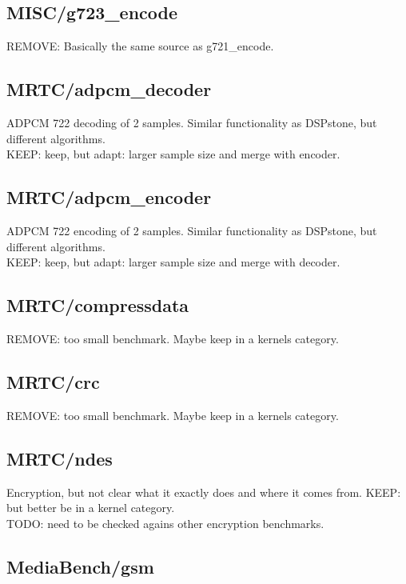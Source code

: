 \documentclass[a4paper]{article}
\begin{document}
\subsection{MISC/g723\_encode}

REMOVE: Basically the same source as g721\_encode.

\subsection{MRTC/adpcm\_decoder}

ADPCM 722 decoding of 2 samples. Similar functionality as 
DSPstone, but different algorithms. \\
KEEP: keep, but adapt: larger sample size and merge with encoder.

\subsection{MRTC/adpcm\_encoder}

ADPCM 722 encoding of 2 samples. Similar functionality as 
DSPstone, but different algorithms. \\
KEEP: keep, but adapt: larger sample size and merge with decoder.

\subsection{MRTC/compressdata}

REMOVE: too small benchmark. Maybe keep in a kernels category.

\subsection{MRTC/crc}

REMOVE: too small benchmark. Maybe keep in a kernels category.

\subsection{MRTC/ndes}

Encryption, but not clear what it exactly does and where it comes from.
KEEP: but better be in a kernel category. \\
TODO: need to be checked agains other encryption benchmarks.

\subsection{MediaBench/gsm}
\end{document}
